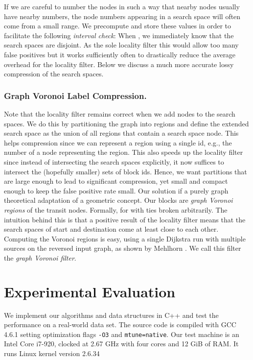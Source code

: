 \documentclass{llncs}
\begin{document}
If we are careful to number the nodes in such a way that nearby nodes 
usually have nearby numbers, the node numbers appearing in a search space
will often come from a small range. We precompute and store these values
in order to facilitate the following \emph{interval check}: When
, we 
immediately know that the search spaces are disjoint. As the sole locality filter this would allow too many false positives but it works sufficiently often to drastically reduce the average overhead for the locality filter.
Below we discuss a much more accurate lossy compression of the search spaces.

\subsubsection{Graph Voronoi Label Compression.}
Note that the locality filter remains correct when we add nodes to the search spaces. 
We do this by partitioning the graph into regions and define the extended search space as the union of all regions that contain a search space node. 
This helps compression since we can represent a region using a single id, e.g., the number of a node representing the region. 
This also speeds up the locality filter since instead of intersecting the search spaces explicitly, it now suffices to intersect the (hopefully smaller) sets of block ids.  
Hence, we want partitions that are large enough to lead to significant compression, yet small and compact enough to keep the false positive rate small. Our solution if a purely graph theoretical adaptation of a geometric concept.
Our blocks are \emph{graph Voronoi regions} of the transit nodes. Formally,  for  with ties broken arbitrarily. The intuition behind this is that a positive result of the locality filter means that the search spaces of start and destination come at least close to each other.
Computing the Voronoi regions is easy, using a single Dijkstra run with multiple sources on the reversed input graph, as shown by Mehlhorn \cite{m-as-88}. 
We call this filter the \emph{graph Voronoi filter}.

\section{Experimental Evaluation}
\label{sec:tnr-experiments}

We implement our algorithms and data structures in C++ and test the performance on a real-world data set.
The source code is compiled with GCC 4.6.1 setting optimization flags \texttt{-O3} and \texttt{mtune=native}.
Our test machine is an Intel Core i7-920, clocked at 2.67 GHz with four cores and 12 GiB of RAM.
It runs Linux kernel version 2.6.34
\end{document}
